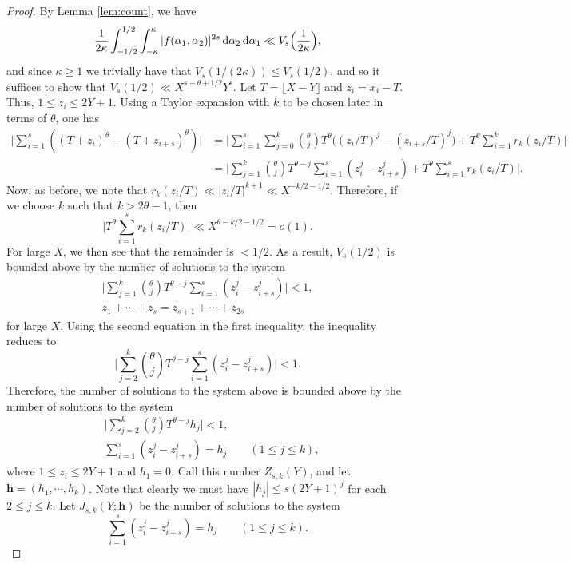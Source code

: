 \documentclass[11pt,reqno]{amsart}
\numberwithin{equation}{section}
\renewcommand{\d}{\,{\rm d}}
\begin{document}
\begin{proof} By Lemma \ref{lem:count}, 
we have 
\[ \frac{1}{2\kappa}\int_{-1/2}^{1/2} \int_{-\kappa}^{\kappa} |f(\alpha_1,\alpha_2)|^{2s} \d\alpha_2 \d\alpha_1 \ll V_s\Big( \frac{1}{2\kappa}\Big), \]
and since $\kappa \geq 1$ we trivially have that $V_s(1/(2\kappa)) \leq V_s(1/2)$, and so it suffices to show that $V_s(1/2) \ll X^{s-\theta+1/2}Y^{\epsilon}$. Let $T = \lfloor X-Y\rfloor$ and $z_i = x_i-T$. Thus, $1 \leq z_i \leq 2Y+1$. 
Using a Taylor expansion with $k$ to be chosen later in terms of $\theta$, one has 
\begin{align*} \Big|\sum_{i=1}^s ((T+z_i)^{\theta}-(T+z_{i+s})^{\theta})\Big| & = \Big|\sum_{i=1}^s \sum_{j=0}^k \binom{\theta}{j}T^{\theta}\big((z_i/T)^j-(z_{i+s}/T)^j\big) + T^{\theta}\sum_{i=1}^k r_k(z_i/T) \Big| \\ 
& = \Big|\sum_{j=1}^k \binom{\theta}{j}T^{\theta-j}\sum_{i=1}^s (z_i^j-z_{i+s}^j) +T^{\theta}\sum_{i=1}^s r_k(z_i/T)\Big|. 
\end{align*}
Now, as before, we note that $r_k(z_i/T) \ll |z_i/T|^{k+1} \ll X^{-k/2-1/2}$. Therefore, if we choose $k$ such that $k > 2\theta-1$, then 
\[ \Big|T^{\theta}\sum_{i=1}^s r_k(z_i/T)\Big| \ll X^{\theta-k/2-1/2} = o(1). \]
For large $X$, we then see that the remainder is $< 1/2$. As a result, $V_s(1/2)$ is bounded above by the number of solutions to the system 
\begin{align*} 
\Big|\sum_{j=1}^k \binom{\theta}{j}T^{\theta-j}\sum_{i=1}^s (z_i^j-z_{i+s}^j)\Big| < 1, \\ 
z_1+\cdots+z_s = z_{s+1}+\cdots+z_{2s}
\end{align*}
for large $X$. Using the second equation in the first inequality, the inequality reduces to 
\[ \Big|\sum_{j=2}^k \binom{\theta}{j}T^{\theta-j}\sum_{i=1}^s (z_i^j-z_{i+s}^j)\Big| < 1. \]
Therefore, the number of solutions to the system above is bounded above by the number of solutions to the system 
\begin{align*} 
 & \Big|\sum_{j=2}^k \binom{\theta}{j}T^{\theta-j}h_j\Big| < 1, \\ 
& \sum_{i=1}^s (z_i^j-z_{i+s}^j) = h_j \quad \quad (1 \leq j \leq k),
\end{align*}
where $1 \leq z_i \leq 2Y+1$ and $h_1 = 0$. Call this number $Z_{s,k}(Y)$, and let $\mathbf{h} = (h_1, \cdots, h_k)$. Note that clearly we must have $|h_j| \leq s(2Y+1)^j$ for each $2 \leq j \leq k$. Let $J_{s,k}(Y; \mathbf{h})$ be the number of solutions to the system 
\[ \sum_{i=1}^s (z_i^j - z_{i+s}^j) = h_j \quad \quad (1 \leq j \leq k). \]

\end{proof}
\end{document}

